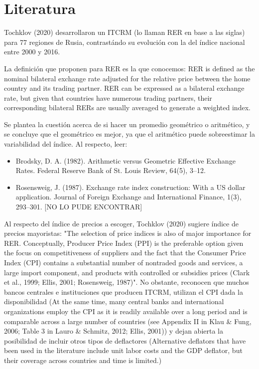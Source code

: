 \chapter{Literatura}\label{chap2} 


Tochklov (2020) desarrollaron un ITCRM (lo llaman RER en base a las siglas) para 77 regiones de Rusia, contrastándo su evolución con la del índice nacional entre 2000 y 2016. 

La definición que proponen para RER es la que conocemos:
{
RER is defined as the nominal bilateral exchange rate
adjusted for the relative price between the home country and its trading partner. RER can be expressed
as a bilateral exchange rate, but given that countries have numerous trading partners, their corresponding
bilateral RERs are usually averaged to generate a weighted index.
}

Se plantea la cuestión acerca de si hacer un promedio geométrico o aritmético, y se concluye que el geométrico es mejor, ya que el aritmético puede sobreestimar la variabilidad del índice. Al respecto, leer:

\begin{itemize}
    \item Brodsky, D. A. (1982). Arithmetic versus Geometric Effective Exchange Rates. Federal Reserve Bank of St. Louis Review, 64(5), 3–12.
    \item Rosensweig, J. (1987). Exchange rate index construction: With a US dollar application. Journal of Foreign Exchange and International Finance, 1(3), 293–301. [NO LO PUDE ENCONTRAR]
\end{itemize}

Al respecto del índice de precios a escoger, Tochklov (2020) sugiere índice de precios mayoristas: "The selection of price indices is also of major importance for RER. Conceptually, Producer Price Index (PPI) is the preferable option given the focus on competitiveness of suppliers and the fact that the
Consumer Price Index (CPI) contains a substantial number of nontraded goods and services, a large import component, and products with controlled or subsidies prices (Clark et al., 1999; Ellis, 2001; Rosensweig, 1987)". No obstante, reconocen que muchos bancos centrales e instituciones que producen ITCRM, utilizan el CPI dada la disponibilidad (At the same time, many central banks and international organizations employ the CPI as it is readily available over a long period and is comparable across a large number of countries (see Appendix II in Klau \& Fung, 2006; Table 3 in Lauro \& Schmitz, 2012; Ellis, 2001)) y dejan abierta la posibilidad de incluir otros tipos de deflactores (Alternative deflators that have been used in the literature include unit labor costs and the GDP deflator, but their coverage across countries and time is limited.)

